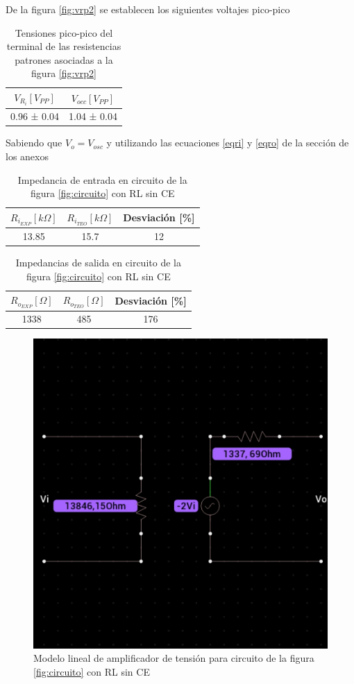 \documentclass[12pt, a4paper]{article}
\begin{document}
    De la figura \ref{fig:vrp2} se establecen los siguientes voltajes pico-pico

    \begin{table}[h!]
        \centering
        \caption{Tensiones pico-pico del terminal de las resistencias patrones asociadas a la figura \ref{fig:vrp2}}
        \label{tab:vrp2}
        \begin{tabular}{|c|c|} \hline
            $V_{R_i} [V_{PP}]$  &   $V_{occ} [V_{PP}]$  \\ \hline
            0.96 ± 0.04         &   1.04 ± 0.04    \\ \hline
        \end{tabular}
    \end{table}

    Sabiendo que $V_o = V_{osc}$ y utilizando las ecuaciones \eqref{eqri} y \eqref{eqro} de la sección de los anexos

    \begin{table}[h!]
        \centering
        \caption{Impedancia de entrada en circuito de la figura \ref{fig:circuito} con RL sin CE}
        \label{tab:rpi2}
        \begin{tabular}{|c|c|c|} \hline
            $R_{i_{EXP}} [k\Omega]$  &   $R_{i_{TEO}} [k\Omega]$ & Desviación [\%]  \\ \hline
            13.85         &   15.7   & 12 \\ \hline
        \end{tabular}
    \end{table}

    \begin{table}[h!]
        \centering
        \caption{Impedancias de salida en circuito de la figura \ref{fig:circuito} con RL sin CE}
        \label{tab:rpo2}
        \begin{tabular}{|c|c|c|} \hline
            $R_{o_{EXP}} [\Omega]$  &   $R_{o_{TEO}} [\Omega]$ & Desviación [\%]  \\ \hline
            1338         &   485   & 176 \\ \hline
        \end{tabular}
    \end{table}

    \newpage

    \begin{figure}[h!]
        \centering
        \includegraphics[height=5cm\textwidth]{ma2.jpg}
        \caption{Modelo lineal de amplificador de tensión para circuito de la figura \ref{fig:circuito} con RL sin CE}
        \label{fig:ma2}
    \end{figure}
\end{document}
